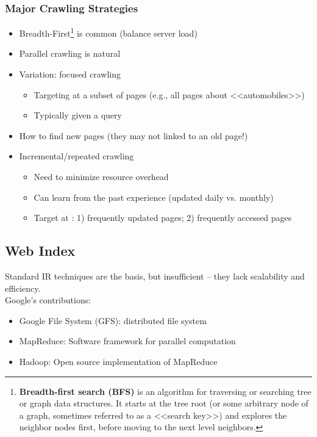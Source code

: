 \subsubsection{Major Crawling Strategies}
\begin{itemize}
\item Breadth-First\footnote{\textbf{Breadth-first search (BFS)} is an algorithm for traversing or searching tree or graph data structures. It starts at the tree root (or some arbitrary node of a graph, sometimes referred to as a <<search key>>) and explores the neighbor nodes first, before moving to the next level neighbors.} is common (balance server load)
\item Parallel crawling is natural

\item Variation: focused crawling
\begin{itemize}
\item Targeting at a subset of pages (e.g., all pages about <<automobiles>>) 
\item Typically given a query
\end{itemize}

\item How to find new pages (they may not linked to an old page!)

\item Incremental/repeated crawling
\begin{itemize}
\item Need to minimize resource overhead
\item Can learn from the past experience (updated daily vs. monthly)
\item Target at : 1) frequently updated pages; 2) frequently accessed pages
\end{itemize}
\end{itemize}

\subsection{Web Index}

Standard IR techniques are the basis, but insufficient – they lack scalability and efficiency. \\

Google’s contributions:
\begin{itemize}
\item Google File System (GFS): distributed file system
\item MapReduce: Software framework for parallel computation 
\item Hadoop: Open source implementation of MapReduce
\end{itemize}

